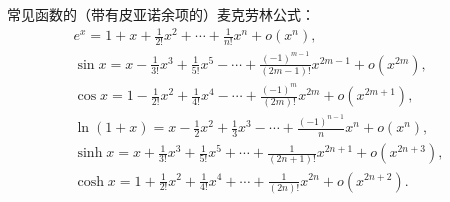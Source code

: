 常见函数的（带有皮亚诺余项的）麦克劳林公式：
\begin{gather*}
	e^x = 1 + x + \frac{1}{2!} x^2 + \dotsb + \frac{1}{n!} x^n + o(x^n), \\
	\sin x = x - \frac{1}{3!} x^3 + \frac{1}{5!} x^5 - \dotsb + \frac{(-1)^{m-1}}{(2m-1)!} x^{2m-1} + o(x^{2m}), \\
	\cos x = 1 - \frac{1}{2!} x^2 + \frac{1}{4!} x^4 - \dotsb + \frac{(-1)^m}{(2m)!} x^{2m} + o(x^{2m+1}), \\
	\ln(1+x) = x - \frac{1}{2} x^2 + \frac{1}{3} x^3 - \dotsb + \frac{(-1)^{n-1}}{n} x^n + o(x^n), \\
	\sinh x = x + \frac{1}{3!} x^3 + \frac{1}{5!} x^5 + \dotsb + \frac{1}{(2n+1)!} x^{2n+1} + o(x^{2n+3}), \\
	\cosh x = 1 + \frac{1}{2!} x^2 + \frac{1}{4!} x^4 + \dotsb + \frac{1}{(2n)!} x^{2n} + o(x^{2n+2}).
\end{gather*}
